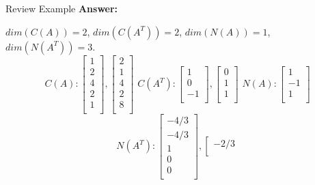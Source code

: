 \documentclass{beamer}
\begin{document}
\begin{frame}{Review Example}
\textbf{Answer:}

$dim(C(A))=2$, $dim(C(A^T))=2$, $dim(N(A))=1$, $dim(N(A^T))=3$.
\begin{equation*}
    C\left( A \right) :\left[ \begin{array}{c}
        1\\
        2\\
        4\\
        2\\
        1\\
    \end{array} \right] ,\left[ \begin{array}{c}
        2\\
        1\\
        4\\
        2\\
        8\\
    \end{array} \right] \,\, C\left( A^T \right) :\left[ \begin{array}{c}
        1\\
        0\\
        -1\\
    \end{array} \right] ,\left[ \begin{array}{c}
        0\\
        1\\
        1\\
    \end{array} \right] \,\,N\left( A \right) :\left[ \begin{array}{c}
        1\\
        -1\\
        1\\
    \end{array} \right]
\end{equation*}
\begin{equation*}
    N\left( A^T \right) :\left[ \begin{array}{c}
        -4/3\\
        -4/3\\
        1\\
        0\\
        0\\
    \end{array} \right] ,\left[ \begin{array}{c}
        -2/3\\

\end{array}
\end{equation*}
\end{frame}
\end{document}
